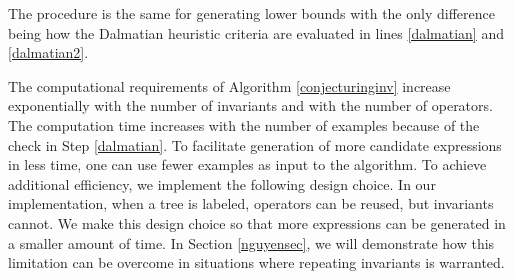 \documentclass[ijds,nonblindrev]{informs-ijds}
\begin{document}
The procedure is the same for generating lower bounds with the only difference being how the Dalmatian heuristic criteria are evaluated in lines \ref{dalmatian} and \ref{dalmatian2}.

The computational requirements of Algorithm \ref{conjecturinginv} increase exponentially with the number of invariants and with the number of operators.  The computation time increases with the number of examples because of the check in Step \ref{dalmatian}.  To facilitate generation of more candidate expressions in less time, one can use fewer examples as input to the algorithm.  To achieve additional efficiency, we implement the following design choice.
In our implementation, when a tree is labeled, operators can be reused, but invariants cannot.  We make this design choice so that more expressions can be generated in a smaller amount of time.  In Section \ref{nguyensec}, we will demonstrate how this limitation can be overcome in situations where repeating invariants is warranted.    
\end{document}

